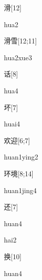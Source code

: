\begin{verbete}[hua2]{滑}[12]
\begin{pronuncia}{hua2}
\end{pronuncia}
\end{verbete}

\begin{verbete}{滑雪}[12;11]
\begin{pronuncia}{hua2xue3}
\end{pronuncia}
\end{verbete}

\begin{verbete}[hua4]{话}[8]
\begin{pronuncia}{hua4}
\end{pronuncia}
\end{verbete}

\begin{verbete}[huai4]{坏}[7]
\begin{pronuncia}{huai4}
\end{pronuncia}
\end{verbete}

\begin{verbete}{欢迎}[6;7]
\begin{pronuncia}{huan1ying2}
\end{pronuncia}
\end{verbete}

\begin{verbete}{环境}[8;14]
\begin{pronuncia}{huan1jing4}
\end{pronuncia}
\end{verbete}

\begin{verbete}[huan4]{还}[7]
\begin{pronuncia}{huan4}
\end{pronuncia}
\begin{pronuncia}{hai2}
\end{pronuncia}
\end{verbete}

\begin{verbete}[huan4]{换}[10]
\begin{pronuncia}{huan4}
\end{pronuncia}
\end{verbete}

